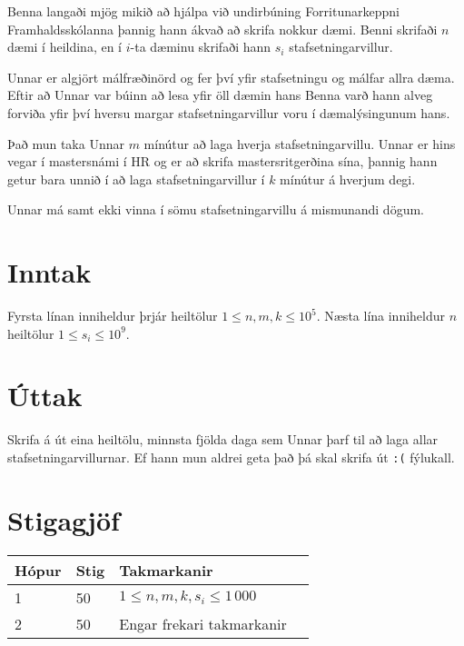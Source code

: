 Benna langaði mjög mikið að hjálpa við undirbúning Forritunarkeppni Framhaldsskólanna þannig
hann ákvað að skrifa nokkur dæmi. Benni skrifaði $n$ dæmi í heildina, en í
$i$-ta dæminu skrifaði hann $s_i$ stafsetningarvillur.

Unnar er algjört málfræðinörd og fer því yfir stafsetningu og málfar allra dæma.
Eftir að Unnar var búinn að lesa yfir öll dæmin hans Benna varð hann alveg forviða
yfir því hversu margar stafsetningarvillur voru í dæmalýsingunum hans.

Það mun taka Unnar $m$ mínútur að laga hverja stafsetningarvillu.
Unnar er hins vegar í mastersnámi í HR og er að skrifa mastersritgerðina sína, þannig
hann getur bara unnið í að laga stafsetningarvillur í $k$ mínútur á hverjum degi.

Unnar má samt ekki vinna í sömu stafsetningarvillu á mismunandi dögum.

\section*{Inntak}
Fyrsta línan inniheldur þrjár heiltölur $1 \le n,m,k \le 10^5$.
Næsta lína inniheldur $n$ heiltölur $1 \le s_i \le 10^9$.

\section*{Úttak}
Skrifa á út eina heiltölu, minnsta fjölda daga sem Unnar þarf til að laga allar stafsetningarvillurnar.
Ef hann mun aldrei geta það þá skal skrifa út \texttt{:(} fýlukall.

\section*{Stigagjöf}
\begin{tabular}{|l|l|l|l|}
\hline
Hópur & Stig & Takmarkanir \\ \hline
1     & 50  & $1 \le n,m,k,s_i \le 1\,000$ \\ \hline
2     & 50 & Engar frekari takmarkanir \\ \hline
\end{tabular}
